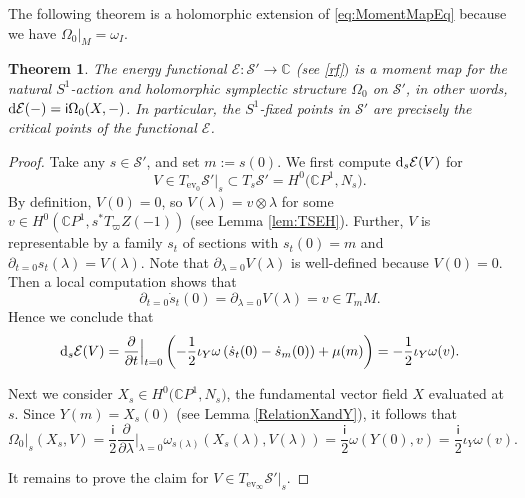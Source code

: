 \documentclass[pdftex]{sigma}
\numberwithin{equation}{section}
\newtheorem{Theorem}{Theorem}[section]
\theoremstyle{definition}
\newcommand\C{{\mathbb C}}
\renewcommand{\i}{\mathsf{i}}
\begin{document}
The following theorem is a holomorphic extension of \eqref{eq:MomentMapEq} because we have $\Omega_0|_M = \omega_I$.

\begin{Theorem}\label{EnergyMomentMap}
The energy functional $\mathcal{E} \colon \mathcal{S}' \longrightarrow \C$ {\rm(}see \eqref{rf}$)$ is a moment map for the natural
$S^1$-action and holomorphic symplectic structure $\Omega_0$ on $\mathcal{S}'$, in other words,
${\rm d}\mathcal{E}(-) = \i \Omega_0(X, -)$.
In particular, the $S^1$-fixed points in $\mathcal{S}'$ are precisely the critical points of
the functional $\mathcal{E}$.
\end{Theorem}

\begin{proof}
Take any $s \in \mathcal{S}'$, and set $m := s(0)$.
We first compute ${\rm d}_s \mathcal{E}(V)$ for
\[V \in T_{\operatorname{ev}_0}\mathcal S'|_s \subset T_s \mathcal{S}'
 = H^0\bigl(\C P^1, N_s\bigr) .\]
By definition, $V(0) = 0$, so $V(\lambda) = v\otimes\lambda$ for some $v \in H^0(\C P^1, s^*T_{\varpi}Z(-1))$
(see Lemma \ref{lem:TSEH}).
Further, $V$ is representable by a family $s_t$ of sections with $s_t(0) = m$ and
$\partial_{t=0} s_t(\lambda) = V(\lambda)$.
Note that $\partial_{\lambda = 0} V(\lambda)$ is well-defined because $V(0) = 0$.
Then a local computation shows that
\[\partial_{t = 0} \dot{s}_t(0) = \partial_{\lambda = 0} V(\lambda) = v \in T_m M.\]
Hence we conclude that
\[
{\rm d}_s \mathcal{E}(V) = \frac{\partial}{\partial t}\Big\vert_{t = 0} \left( -\frac{1}{2} \iota_Y
\omega\left(\dot{s}_t(0) - \dot{s}_m(0)\right) + \mu(m) \right) = -\frac{1}{2} \iota_Y \omega(v).
\]

Next we consider $X_s \in H^0\bigl(\C P^1, N_s\bigr)$, the fundamental vector field $X$ evaluated at $s$.
Since $Y(m) = X_s(0)$ (see Lemma \ref{RelationXandY}), it follows that
\[
\Omega_0|_s(X_s, V) = \frac{\i}{2}\frac{\partial}{\partial\lambda}\Big|_{\lambda=0}\omega_{s(\lambda)}(X_s(\lambda), V(\lambda))
 = \frac{\i}{2}\omega(Y(0), v) = \frac{\i}{2}\iota_Y\omega(v).
\]

It remains to prove the claim for $V \in T_{\operatorname{ev}_\infty}{\mathcal S}'\big\vert_s$.


\end{proof}
\end{document}
